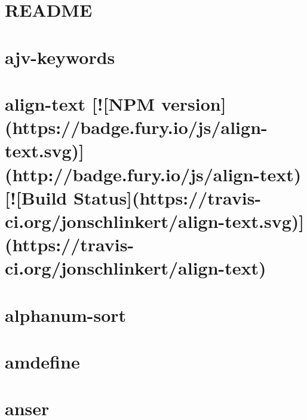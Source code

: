 \documentclass[twoside]{book}
\newcommand{\+}{\discretionary{\mbox{\scriptsize$\hookleftarrow$}}{}{}}
\begin{document}
\chapter{R\+E\+A\+D\+ME}
\label{md__c_1_workspace_demo_src_main_script_node_modules_ajv-keywords_keywords_dotjs__r_e_a_d_m_e}

\chapter{ajv-\/keywords}
\label{md__c_1_workspace_demo_src_main_script_node_modules_ajv-keywords__r_e_a_d_m_e}

\chapter{align-\/text \mbox{[}!\mbox{[}N\+PM version\mbox{]}(https\+://badge.fury.\+io/js/align-\/text.svg)\mbox{]}(http\+://badge.fury.\+io/js/align-\/text) \mbox{[}!\mbox{[}Build Status\mbox{]}(https\+://travis-\/ci.org/jonschlinkert/align-\/text.svg)\mbox{]}(https\+://travis-\/ci.org/jonschlinkert/align-\/text)}
\label{md__c_1_workspace_demo_src_main_script_node_modules_align-text__r_e_a_d_m_e}

\chapter{alphanum-\/sort}
\label{md__c_1_workspace_demo_src_main_script_node_modules_alphanum-sort__r_e_a_d_m_e}

\chapter{amdefine}
\label{md__c_1_workspace_demo_src_main_script_node_modules_amdefine__r_e_a_d_m_e}

\chapter{anser}
\label{md__c_1_workspace_demo_src_main_script_node_modules_anser__r_e_a_d_m_e}

\end{document}
